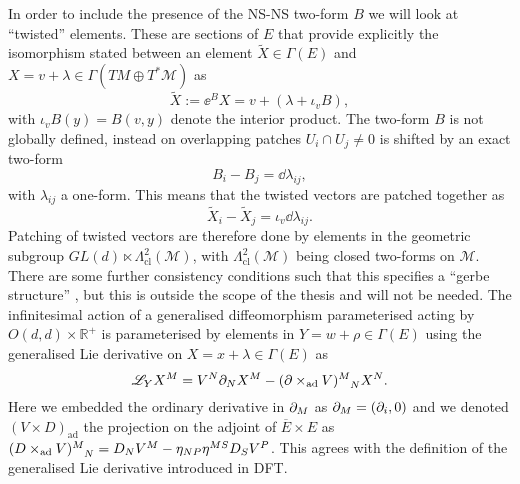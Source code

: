 In order to include the presence of the NS-NS two-form $B$ we will look at ``twisted'' elements. These are sections of $E$ that provide explicitly the isomorphism stated between an element $\tilde{X}\in\Gamma(E)$ and $X=v+\lambda\in\Gamma(TM\oplus T^*\mathcal{M})$ as
\begin{equation}
    \tilde{X} := \ee^{B}X = v+\left(\lambda+\iota_v B\right),
\end{equation}
with $\iota_vB(y)=B(v,y)$ denote the interior product. The two-form $B$ is not globally defined, instead on overlapping patches $U_i\cap U_j\neq 0$ is shifted by an exact two-form
\begin{equation}
    B_i-B_j = \dd \lambda_{ij},
\end{equation}
with $\lambda_{ij}$ a one-form. This means that the twisted vectors are patched together as 
\begin{equation}
    \tilde{X}_i-\tilde{X}_j = \iota_v\dd \lambda_{ij}. 
\end{equation}
Patching of twisted vectors are therefore done by elements in the geometric subgroup $GL(d)\ltimes \Lambda^2_{\text{cl}}(\mathcal{M})$, with $\Lambda^2_{\text{cl}}(\mathcal{M})$ being closed two-forms on $\mathcal{M}$. There are some further consistency conditions such that this specifies a ``gerbe structure'' \cite{Hitchin:1999fh}, but this is outside the scope of the thesis and will not be needed. 
The infinitesimal action of a generalised diffeomorphism parameterised acting by $O(d,d)\times \mathbb{R}^+$ is parameterised by elements in $Y=w+\rho\in\Gamma(E)$ using the generalised Lie derivative on $X=x+\lambda\in\Gamma(E)$ as 
\begin{equation}
    \mathscr{L}_YX^M = V^N\pd_NX^M-(\pd\times_{\text{ad}} V)\tensor{}{^M_N} X^N.
\end{equation}
Here we embedded the ordinary derivative in $\partial_M$ as $\partial_M=(\partial_i,0)$ and we denoted $(V\times D)_{\text{ad}}$ the projection on the adjoint of $\overbar{E}\times E$ as  $(D\times_{\text{ad}} V)\tensor{}{^M_N}=D_NV^M-\eta_{NP}\eta^{MS}D_SV^P$. This agrees with the definition of the generalised Lie derivative introduced in DFT.


